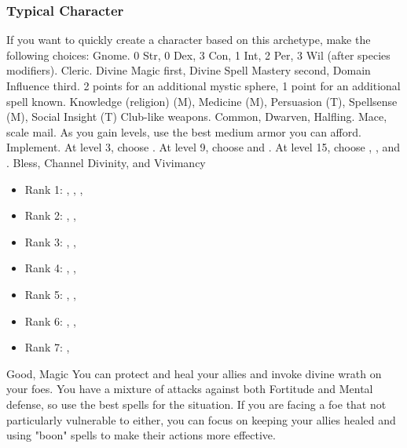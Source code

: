         \subsubsection{Typical Character}
            If you want to quickly create a character based on this archetype, make the following choices:
             Gnome.
             0 Str, 0 Dex, 3 Con, 1 Int, 2 Per, 3 Wil (after species modifiers).
             Cleric.
             Divine Magic first, Divine Spell Mastery second, Domain Influence third.
             2 points for an additional mystic sphere, 1 point for an additional spell known.
             Knowledge (religion) (M), Medicine (M), Persuasion (T), Spellsense (M), Social Insight (T)
             Club-like weapons.
             Common, Dwarven, Halfling.
             Mace, scale mail. As you gain levels, use the best medium armor you can afford.
             Implement.
                At level 3, choose .
                At level 9, choose  and .
                At level 15, choose , , and .
             Bless, Channel Divinity, and Vivimancy
            \begin{itemize}
                \item Rank 1: , , , 
                \item Rank 2: , , 
                \item Rank 3: , , 
                \item Rank 4: , , 
                \item Rank 5: , , 
                \item Rank 6: , , 
                \item Rank 7: , 
            \end{itemize}
             Good, Magic
             You can protect and heal your allies and invoke divine wrath on your foes.
            You have a mixture of attacks against both Fortitude and Mental defense, so use the best spells for the situation.
            If you are facing a foe that not particularly vulnerable to either, you can focus on keeping your allies healed and using "boon" spells to make their actions more effective.

